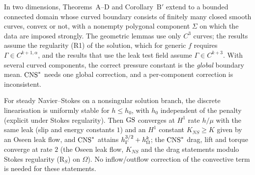 \begin{theoremG}
In two dimensions, Theorems~A--D and Corollary~B$'$ extend to a bounded connected domain whose curved boundary consists of finitely many closed smooth curves, convex or not, with a nonempty polygonal component $\Sigma$ on which the data are imposed strongly. The geometric lemmas use only $C^3$ curves; the results assume the regularity (R1) of the solution, which for generic $f$ requires $\Gamma\in C^{k+1,\alpha}$, and the results that use the leak test field assume $\Gamma\in C^{k+3}$. With several curved components, the correct pressure constant is the \emph{global} boundary mean. $\mathrm{CNS}^\ast$ needs one global correction, and a per-component correction is inconsistent.
\end{theoremG}

\begin{theoremH}
For steady Navier--Stokes on a nonsingular solution branch, the discrete linearisation is uniformly stable for $h\le h_0$, with $h_0$ independent of the penalty (explicit under Stokes regularity). Then $\mathrm{GS}$ converges at $H^1$ rate $h/\mu$ with the same leak (slip and energy constants $1$) and an $H^1$ constant $K_{NS}\ge K$ given by an Oseen leak flow, and $\mathrm{CNS}^\ast$ attains $h_\Gamma^{3/2}+h_\Omega^k$; the $\mathrm{CNS}^\ast$ drag, lift and torque converge at rate $2$ (the Oseen leak flow, $K_{NS}$ and the drag statements modulo Stokes regularity (R$_S$) on $\Omega$). No inflow/outflow correction of the convective term is needed for these statements.
\end{theoremH}

